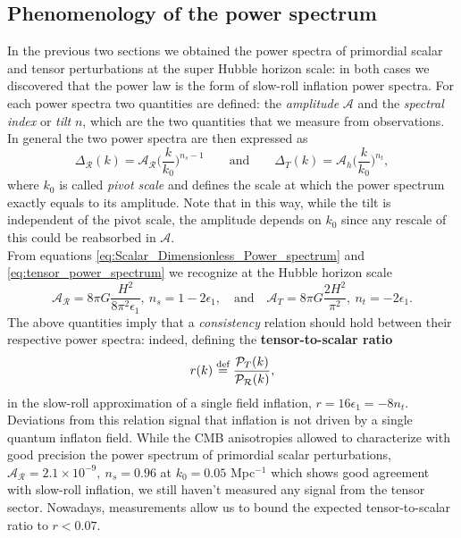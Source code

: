 \subsection{Phenomenology of the power spectrum}
In the previous two sections we obtained the power spectra of primordial scalar and tensor perturbations at the super Hubble horizon scale: in both cases we discovered that the power law is the form of slow-roll inflation power spectra. For each power spectra two quantities are defined: the \emph{amplitude} $\mathcal A$ and the \emph{spectral index} or \emph{tilt} $n$, which are the two quantities that we measure from observations. In general the two power spectra are then expressed as
\begin{equation}
    \Delta_\mathcal{R}(k)=\mathcal{A_R}\bigg(\frac{k}{k_0}\bigg)^{n_s-1}\qquad\text{and}\qquad\Delta_T(k)=\mathcal{A}_h\bigg(\frac{k}{k_0}\bigg)^{n_t},
\end{equation}
where $k_0$ is called \emph{pivot scale} and defines the scale at which the power spectrum exactly equals to its amplitude. Note that in this way, while the tilt is independent of the pivot scale, the amplitude depends on $k_0$ since any rescale of this could be reabsorbed in $\mathcal A$.\\ From equations \eqref{eq:Scalar_Dimensionless_Power_spectrum} and \eqref{eq:tensor_power_spectrum} we recognize at the Hubble horizon scale
\begin{equation}
    \mathcal{A_R}=8\pi G\frac{H^2}{8\pi^2\epsilon_1},\ n_s=1-2\epsilon_1,\quad\text{and}\quad\mathcal{A}_T=8\pi G\frac{2H^2}{\pi^2},\ n_t=-2\epsilon_1.
\end{equation}
The above quantities imply that a \emph{consistency} relation should hold between their respective power spectra: indeed, defining the \textbf{tensor-to-scalar ratio}
\begin{equation}
    r(k)\stackrel{\text{def}}{=}\frac{\mathcal{P}_T(k)}{\mathcal{P_R}(k)},
\end{equation} 
in the slow-roll approximation of a single field inflation, $r=16\epsilon_1=-8n_t$. Deviations from this relation signal that inflation is not driven by a single quantum inflaton field. While the CMB anisotropies allowed to characterize with good precision the power spectrum of primordial scalar perturbations, $\mathcal{A_R}=2.1\times 10^{-9},\ n_s=0.96$ at $k_0=0.05$ Mpc$^{-1}$ \cite{planck2018results} which shows good agreement with slow-roll inflation, we still haven't measured any signal from the tensor sector. Nowadays, measurements allow us to bound the expected tensor-to-scalar ratio to $r<0.07$.

